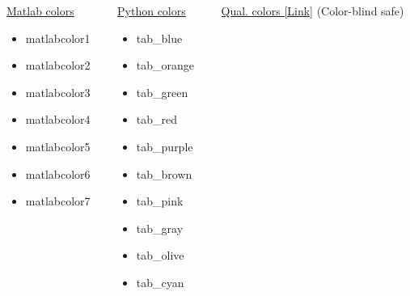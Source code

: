 \documentclass[aspectratio=169,11pt]{beamer}
\begin{document}
\begin{frame}{\insertsection}
    \begin{columns}[t]
        \begin{column}{0.24\textwidth}
            \underline{Matlab colors}
            \begin{itemize}
                \item \textcolor{matlabcolor1}{matlabcolor1}
                \item \textcolor{matlabcolor2}{matlabcolor2}
                \item \textcolor{matlabcolor3}{matlabcolor3}
                \item \textcolor{matlabcolor4}{matlabcolor4}
                \item \textcolor{matlabcolor5}{matlabcolor5}
                \item \textcolor{matlabcolor6}{matlabcolor6}
                \item \textcolor{matlabcolor7}{matlabcolor7}
            \end{itemize}
        \end{column}
        \begin{column}{0.24\textwidth}
            \underline{Python colors}
            \begin{itemize}
            \item \textcolor{tab_blue}{tab\_blue}
            \item \textcolor{tab_orange}{tab\_orange}
            \item \textcolor{tab_green}{tab\_green}
            \item \textcolor{tab_red}{tab\_red}
            \item \textcolor{tab_purple}{tab\_purple}
            \item \textcolor{tab_brown}{tab\_brown}
            \item \textcolor{tab_pink}{tab\_pink}
            \item \textcolor{tab_gray}{tab\_gray}
            \item \textcolor{tab_olive}{tab\_olive}
            \item \textcolor{tab_cyan}{tab\_cyan}
            \end{itemize}
        \end{column}
        \begin{column}{0.24\textwidth}
            \underline{Qual. colors \href{https://personal.sron.nl/~pault/}{[Link]}}
            (Color-blind safe)
            \begin{itemize}

\end{itemize}
\end{column}
\end{columns}
\end{frame}
\end{document}

